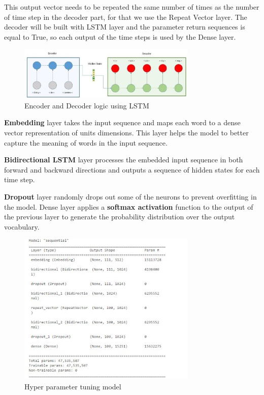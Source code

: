 \documentclass{article}
\begin{document}
This output vector needs to be repeated the same number of times as the number of time step in the decoder part, for that we use the Repeat Vector layer. The decoder will be built with LSTM layer and the parameter return sequences is equal to True, so each output of the time steps is used by the Dense layer.


\begin{figure}[htp]
    \centering
    \includegraphics[width=8.5cm]{8.jpg}
    \caption{Encoder and Decoder logic using LSTM}
    \label{fig:galaxy}
\end{figure}

\textbf{Embedding} layer takes the input sequence and maps each word to a dense vector representation of units dimensions. This layer helps the model to better capture the meaning of words in the input sequence. 

\textbf{Bidirectional LSTM} layer processes the embedded input sequence in both forward and backward directions and outputs a sequence of hidden states for each time step. \cite{rathod2014machine}

\textbf{Dropout}  layer randomly drops out some of the neurons to prevent overfitting in the model. Dense layer applies a \textbf{softmax activation} function to the output of the previous layer to generate the probability distribution over the output vocabulary.

\begin{figure}[htp]
    \centering
    \includegraphics[width=8.5cm]{5.jpg}
    \caption{Hyper parameter tuning model}
    \label{fig:galaxy}
\end{figure}
\end{document}
